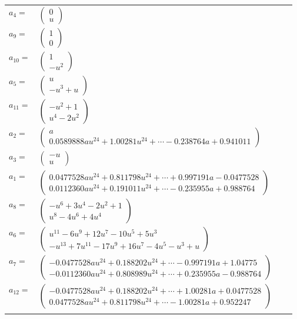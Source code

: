 \documentclass[1p]{elsarticle_modified}
\theoremstyle{definition}
\begin{document}
\begin{tabular}{m{7pt} m{180pt} m{7pt} m{180pt} }
\flushright $a_{4}=$&$\begin{pmatrix}0\\u\end{pmatrix}$ \\
\flushright $a_{9}=$&$\begin{pmatrix}1\\0\end{pmatrix}$ \\
\flushright $a_{10}=$&$\begin{pmatrix}1\\- u^2\end{pmatrix}$ \\
\flushright $a_{5}=$&$\begin{pmatrix}u\\- u^3+u\end{pmatrix}$ \\
\flushright $a_{11}=$&$\begin{pmatrix}- u^2+1\\u^4-2 u^2\end{pmatrix}$ \\
\flushright $a_{2}=$&$\begin{pmatrix}a\\0.0589888 a u^{24}+1.00281 u^{24}+\cdots-0.238764 a+0.941011\end{pmatrix}$ \\
\flushright $a_{3}=$&$\begin{pmatrix}- u\\u\end{pmatrix}$ \\
\flushright $a_{1}=$&$\begin{pmatrix}0.0477528 a u^{24}+0.811798 u^{24}+\cdots+0.997191 a-0.0477528\\0.0112360 a u^{24}+0.191011 u^{24}+\cdots-0.235955 a+0.988764\end{pmatrix}$ \\
\flushright $a_{8}=$&$\begin{pmatrix}- u^6+3 u^4-2 u^2+1\\u^8-4 u^6+4 u^4\end{pmatrix}$ \\
\flushright $a_{6}=$&$\begin{pmatrix}u^{11}-6 u^9+12 u^7-10 u^5+5 u^3\\- u^{13}+7 u^{11}-17 u^9+16 u^7-4 u^5- u^3+u\end{pmatrix}$ \\
\flushright $a_{7}=$&$\begin{pmatrix}-0.0477528 a u^{24}+0.188202 u^{24}+\cdots-0.997191 a+1.04775\\-0.0112360 a u^{24}+0.808989 u^{24}+\cdots+0.235955 a-0.988764\end{pmatrix}$ \\
\flushright $a_{12}=$&$\begin{pmatrix}-0.0477528 a u^{24}+0.188202 u^{24}+\cdots+1.00281 a+0.0477528\\0.0477528 a u^{24}+0.811798 u^{24}+\cdots-1.00281 a+0.952247\end{pmatrix}$\\&\end{tabular}
\end{document}
